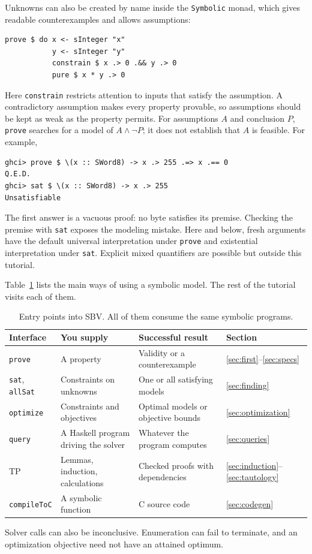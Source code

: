 \documentclass[acmsmall,screen,review,anonymous,nonacm]{acmart}
\newcommand{\code}[1]{\texttt{#1}}
\begin{document}
Unknowns can also be created by name inside the \code{Symbolic} monad, which
gives readable counterexamples and allows assumptions:
\begin{lstlisting}
prove $ do x <- sInteger "x"
           y <- sInteger "y"
           constrain $ x .> 0 .&& y .> 0
           pure $ x * y .> 0
\end{lstlisting}
Here \code{constrain} restricts attention to inputs that satisfy the assumption.
A contradictory assumption makes every property provable, so assumptions should
be kept as weak as the property permits. For assumptions $A$ and conclusion $P$,
\code{prove} searches for a model of $A \land \neg P$; it does not establish that
$A$ is feasible. For example,
\begin{lstlisting}
ghci> prove $ \(x :: SWord8) -> x .> 255 .=> x .== 0
Q.E.D.
ghci> sat $ \(x :: SWord8) -> x .> 255
Unsatisfiable
\end{lstlisting}
The first answer is a vacuous proof: no byte satisfies its premise. Checking the
premise with \code{sat} exposes the modeling mistake. Here and below, fresh
arguments have the default universal interpretation under \code{prove} and
existential interpretation under \code{sat}. Explicit mixed quantifiers are
possible but outside this tutorial.

Table~\ref{tab:interfaces} lists the main ways of using a symbolic model. The
rest of the tutorial visits each of them.

\begin{table}[t]
\caption{Entry points into SBV. All of them consume the same symbolic programs.}
\label{tab:interfaces}
\begin{tabularx}{\linewidth}{@{}l X X l@{}}
\toprule
Interface & You supply & Successful result & Section\\
\midrule
\code{prove} & A property & Validity or a counterexample & \ref{sec:first}--\ref{sec:specs}\\
\code{sat}, \code{allSat} & Constraints on unknowns & One or all satisfying models & \ref{sec:finding}\\
\code{optimize} & Constraints and objectives & Optimal models or objective bounds & \ref{sec:optimization}\\
\code{query} & A Haskell program driving the solver & Whatever the program computes & \ref{sec:queries}\\
TP & Lemmas, induction, calculations & Checked proofs with dependencies & \ref{sec:induction}--\ref{sec:tautology}\\
\code{compileToC} & A symbolic function & C source code & \ref{sec:codegen}\\
\bottomrule
\end{tabularx}
\smallskip
\par\small Solver calls can also be inconclusive. Enumeration can fail to
terminate, and an optimization objective need not have an attained optimum.
\end{table}
\end{document}
